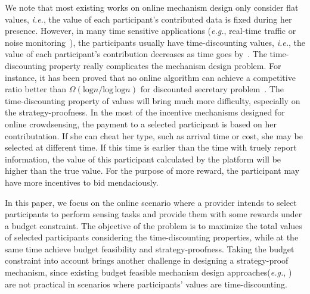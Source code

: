 \documentclass[conference,compsocconf,letterpaper,10pt]{IEEEtran}
\newcommand{\ie}{{\em i.e.}}
\newcommand{\eg}{{\em e.g.}}
\begin{document}
We note that most existing works on online mechanism design only consider flat values, \ie, the value of each participant's contributed data is fixed during her presence. However, in many time sensitive applications (\eg, real-time traffic or noise monitoring~\cite{Chon:2014:SWP:2632048.2636066,Ji:2016:USB:2971648.2971735,Zappatore:2016:CAM:2851613.2851699,Cherian:2015:PPG:2809695.2817881}), the participants usually have time-discounting values, \ie, the value of each participant's contribution decreases as time goes by~\cite{babaioff2009secretary, wu2014strategy}. The time-discounting property really complicates the mechanism design problem. For instance, it has been proved that no online algorithm can achieve a competitive ratio better than $\Omega(\textrm{log}n/\textrm{log}\,\textrm{log}n)$ for discounted secretary problem~\cite{babaioff2009secretary}. The time-discounting property of values will bring much more difficulty, especially on the strategy-proofness. In the most of the incentive mechanisms designed for online crowdsensing, the payment to a selected participant is based on her contributation. If she can cheat her type, such as arrival time or cost, she may be selected at different time. If this time is earlier than the time with truely report information, the value of this participant calculated by the platform will be higher than the true value. For the purpose of more reward, the participant may have more incentives to bid mendaciously.


In this paper, we focus on the online scenario where a provider intends to select participants to perform sensing tasks and provide them with some rewards under a budget constraint. The objective of the problem is to maximize the total values of selected participants considering the time-discounting properties, while at the same time achieve budget feasibility and strategy-proofness. Taking the budget constraint into account brings another challenge in designing a strategy-proof mechanism, since existing budget feasible mechanism design approaches(\eg, \cite{singer2010budget, chen2011approximability,Bei:2012:BFM:2213977.2214020,Chen:2011:ABF:2133036.2133090}) are not practical in scenarios where participants' values are time-discounting.
\end{document}
